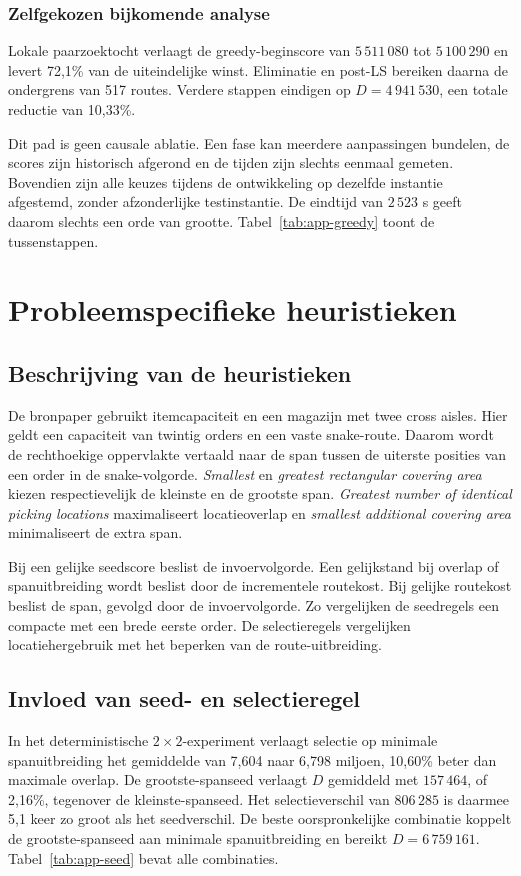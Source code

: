 \documentclass[a4paper,11pt]{article}
\newcommand{\dist}{\ensuremath{D}}
\begin{document}
\subsubsection{Zelfgekozen bijkomende analyse}
Lokale paarzoektocht verlaagt de greedy-beginscore van $5\,511\,080$ tot
$5\,100\,290$ en levert 72,1\% van de uiteindelijke winst. Eliminatie en post-LS
bereiken daarna de ondergrens van 517 routes. Verdere stappen eindigen op
$D=4\,941\,530$, een totale reductie van 10,33\%.

Dit pad is geen causale ablatie. Een fase kan meerdere aanpassingen bundelen, de
scores zijn historisch afgerond en de tijden zijn slechts eenmaal gemeten.
Bovendien zijn alle keuzes tijdens de ontwikkeling op dezelfde instantie
afgestemd, zonder afzonderlijke testinstantie. De eindtijd van
$2\,523$ s geeft daarom slechts een orde van grootte. Tabel~\ref{tab:app-greedy}
toont de tussenstappen.

\vspace{5pt}
\section{Probleemspecifieke heuristieken}

\subsection{Beschrijving van de heuristieken}
De bronpaper gebruikt itemcapaciteit en een magazijn met twee cross aisles. Hier
geldt een capaciteit van twintig orders en een vaste snake-route. Daarom wordt
de rechthoekige oppervlakte vertaald naar de span tussen de uiterste posities
van een order in de snake-volgorde. \emph{Smallest} en \emph{greatest
rectangular covering area} kiezen respectievelijk de kleinste en de grootste span. \emph{Greatest
number of identical picking locations} maximaliseert locatieoverlap en
\emph{smallest additional covering area} minimaliseert de extra span.

Bij een gelijke seedscore beslist de invoervolgorde. Een gelijkstand bij overlap of
spanuitbreiding wordt beslist door de incrementele routekost. Bij gelijke
routekost beslist de span, gevolgd door de invoervolgorde. Zo vergelijken de
seedregels een compacte met een brede eerste order. De selectieregels vergelijken
locatiehergebruik met het beperken van de route-uitbreiding.

\subsection{Invloed van seed- en selectieregel}
In het deterministische $2\times2$-experiment verlaagt selectie op minimale
spanuitbreiding het gemiddelde van 7,604 naar 6,798 miljoen, 10,60\% beter dan
maximale overlap. De grootste-spanseed verlaagt \dist{} gemiddeld met $157\,464$,
of 2,16\%, tegenover de kleinste-spanseed. Het selectieverschil van $806\,285$ is daarmee 5,1 keer zo
groot als het seedverschil. De beste oorspronkelijke combinatie koppelt de
grootste-spanseed aan minimale spanuitbreiding en bereikt $D=6\,759\,161$.
Tabel~\ref{tab:app-seed} bevat alle combinaties.
\end{document}
